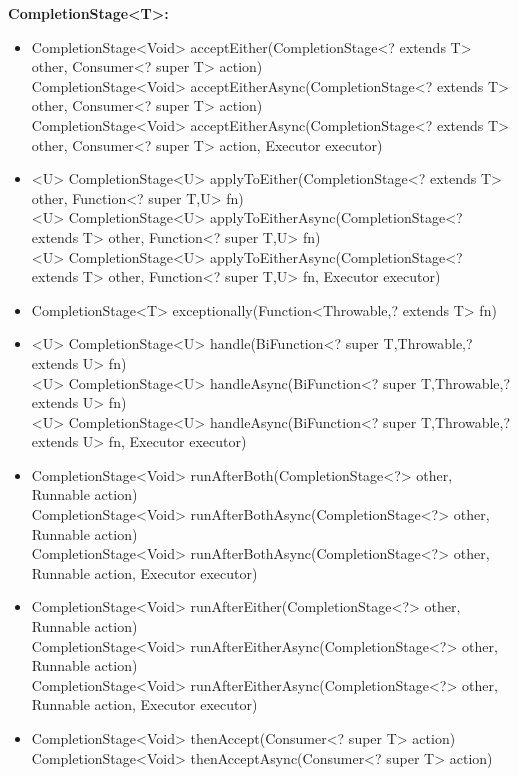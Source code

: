 \documentclass[]{usiinfthesis}
\begin{document}
{\noindent
\textbf{CompletionStage<T>:}
\begin{itemize}
    \item   CompletionStage<Void> acceptEither(CompletionStage<? extends T> other, Consumer<? super T> action)
    \mbox{}\\ CompletionStage<Void> acceptEitherAsync(CompletionStage<? extends T> other, Consumer<? super T> action)
    \mbox{}\\ CompletionStage<Void> acceptEitherAsync(CompletionStage<? extends T> other, Consumer<? super T> action, Executor executor)
    \item   <U> CompletionStage<U> applyToEither(CompletionStage<? extends T> other, Function<? super T,U> fn)
    \mbox{}\\ <U> CompletionStage<U> applyToEitherAsync(CompletionStage<? extends T> other, Function<? super T,U> fn)
    \mbox{}\\ <U> CompletionStage<U> applyToEitherAsync(CompletionStage<? extends T> other, Function<? super T,U> fn, Executor executor)
    \item   CompletionStage<T> exceptionally(Function<Throwable,? extends T> fn)
    \item   <U> CompletionStage<U> handle(BiFunction<? super T,Throwable,? extends U> fn)
    \mbox{}\\ <U> CompletionStage<U> handleAsync(BiFunction<? super T,Throwable,? extends U> fn)
    \mbox{}\\ <U> CompletionStage<U> handleAsync(BiFunction<? super T,Throwable,? extends U> fn, Executor executor)
    \item   CompletionStage<Void> runAfterBoth(CompletionStage<?> other, Runnable action)
    \mbox{}\\ CompletionStage<Void> runAfterBothAsync(CompletionStage<?> other, Runnable action)
    \mbox{}\\ CompletionStage<Void> runAfterBothAsync(CompletionStage<?> other, Runnable action, Executor executor)
    \item   CompletionStage<Void> runAfterEither(CompletionStage<?> other, Runnable action)
    \mbox{}\\ CompletionStage<Void> runAfterEitherAsync(CompletionStage<?> other, Runnable action)
    \mbox{}\\ CompletionStage<Void> runAfterEitherAsync(CompletionStage<?> other, Runnable action, Executor executor)
    \item   CompletionStage<Void> thenAccept(Consumer<? super T> action)
    \mbox{}\\ CompletionStage<Void> thenAcceptAsync(Consumer<? super T> action)

\end{itemize}}
\end{document}

